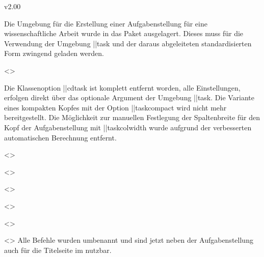 \begin{Entity}{}
\begin{Changes}{v2.00}
\begin{Obsolete}
\minisec{\taskname}
%
\begin{Entity}{}
Die Umgebung für die Erstellung einer Aufgabenstellung für eine 
wissenschaftliche Arbeit wurde in das Paket  
ausgelagert. Dieses muss für die Verwendung der Umgebung \Environment||{task} 
und der daraus abgeleiteten standardisierten Form zwingend geladen werden.

\begin{Obsolete}
  {}
  <>
\begin{Obsolete}
  {}
\begin{Obsolete}
  {}
\printdeclarationlist
%
Die Klassenoption \Option||{cdtask} ist komplett entfernt worden, alle 
Einstellungen, erfolgen direkt über das optionale Argument der Umgebung 
\Environment||{task}. Die Variante eines kompakten Kopfes mit der Option 
\Option||{taskcompact} wird nicht mehr bereitgestellt. Die Möglichkeit zur 
manuellen Festlegung der Spaltenbreite für den Kopf der Aufgabenstellung mit 
\Length||{taskcolwidth} wurde aufgrund der verbesserten automatischen 
Berechnung entfernt.
\end{Obsolete}
\end{Obsolete}
\end{Obsolete}

\begin{Obsolete}
  {}
  <>
\begin{Obsolete}
  {}
  <>
\begin{Obsolete}
  {}
  <>
\begin{Obsolete}
  {}
  <>
\begin{Obsolete}
  {}
  <>
\begin{Obsolete}
  {}
  <>
\printdeclarationlist
%
Alle Befehle wurden umbenannt und sind jetzt neben der Aufgabenstellung auch 
für die Titelseite im \CD nutzbar.
\end{Obsolete}
\end{Obsolete}
\end{Obsolete}
\end{Obsolete}
\end{Obsolete}
\end{Obsolete}


\end{Entity}
\end{Obsolete}
\end{Changes}
\end{Entity}
